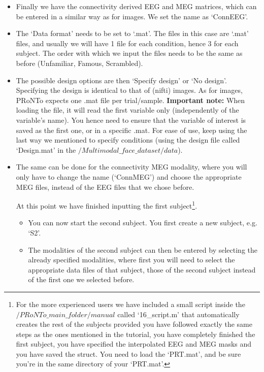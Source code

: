 \begin{itemize}

\item Finally we have the connectivity derived EEG and MEG matrices, which can be entered in a similar way as for images. We set the name as `ConnEEG'.
\item The `Data format' needs to be set to `.mat'. The files in this case are `.mat' files, and usually we will have 1 file for each condition, hence 3 for each subject. The order with which we input the files needs to be the same as before (Unfamiliar, Famous, Scrambled).

\item The possible design options are then ‘Specify design’ or ‘No design’. Specifying the design is identical to that of (nifti) images. As for images, PRoNTo expects one .mat file per trial/sample. \textbf{Important note:} When loading the file, it will read the first variable only (independently of the variable’s name). You hence need to ensure that the variable of interest is saved as the first one, or in a specific .mat. For ease of use, keep using the last way we mentioned to specify conditions (using the design file called `Design.mat' in the $/Multimodal\_face\_dataset/data$).

\item The same can be done for the connectivity MEG modality, where you will only have to change the name (`ConnMEG') and choose the appropriate MEG files, instead of the EEG files that we chose before.


At this point we have finished inputting the first subject\footnote{For the more experienced users we have included a small \matlab{} script inside the $/PRoNTo\_main\_folder/manual$ called `16\_script.m' that automatically creates the rest of the subjects provided you have followed exactly the same steps as the ones mentioned in the tutorial, you have completely finished the first subject, you have specified the interpolated EEG and MEG masks and you have saved the struct. You need to load the `PRT.mat', and be sure you're in the same directory of your `PRT.mat'.}. 

\begin{itemize}
\item You can now start the second subject. You first create a new subject, e.g. `S2'.

\item The modalities of the second subject can then be entered by selecting the already specified modalities, where first you will need to select the appropriate data files of that subject, those of the second subject instead of the first one we selected before.


\end{itemize}
\end{itemize}
